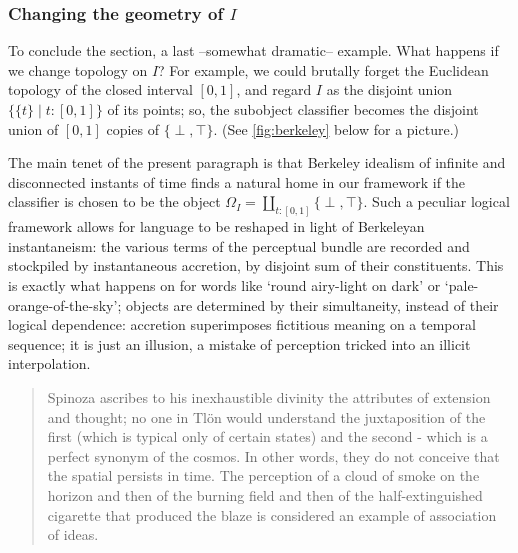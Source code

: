 \subsubsection{Changing the geometry of $I$}
To conclude the section, a last --somewhat dramatic-- example. What happens if we change topology on $I$? For example, we could brutally forget the Euclidean topology of the closed interval $[0,1]$, and regard $I$ as the disjoint union $\{ \{t\} \mid t: [0,1]\}$ of its points; so, the subobject classifier becomes the disjoint union of $[0,1]$ copies of $\{\perp,\top\}$. (See \autoref{fig:berkeley} below for a picture.)
\begin{example}\label{incendiata}
  The main tenet of the present paragraph is that Berkeley idealism of infinite and disconnected instants of time finds a natural home in our framework if the classifier is chosen to be the object $\Omega_I = \coprod_{t : [0,1]} \{ \perp,\top\}$. Such a peculiar logical framework allows for language to be reshaped in light of Berkeleyan instantaneism: the various terms of the perceptual bundle are recorded and stockpiled by instantaneous accretion, by disjoint sum of their constituents. This is exactly what happens on \tlon for words like `round airy-light on dark' or `pale-orange-of-the-sky'; objects are determined by their simultaneity, instead of their logical dependence: accretion superimposes fictitious meaning on a temporal sequence; it is just an illusion, a mistake of perception tricked into an illicit interpolation.
  \begin{quote}
    \hspace{.5em} Spinoza ascribes to his inexhaustible divinity the attributes of extension and thought; no one in Tlön would understand the juxtaposition of the first (which is typical only of certain states) and the second - which is a perfect synonym of the cosmos. In other words, they do not conceive that the spatial persists in time. The perception of a cloud of smoke on the horizon and then of the burning field and then of the half-extinguished cigarette that produced the blaze is considered an example of association of ideas.   \hfill\cite{tlonEN}
  \end{quote}
  \begin{center}
    \begin{figure}[h]
\end{figure}
\end{center}
\end{example}
